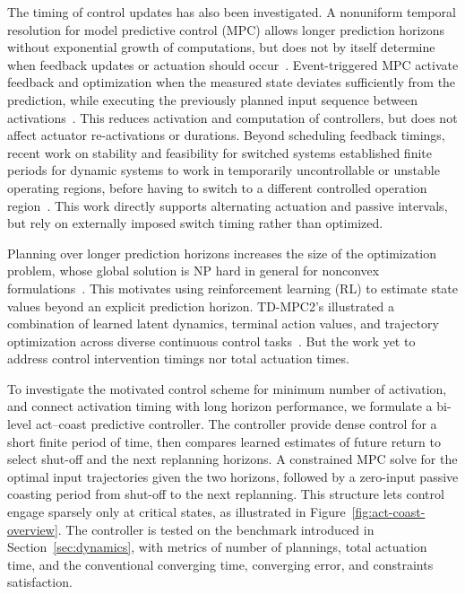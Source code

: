 \documentclass[letterpaper,10pt,conference]{ieeeconf}
\begin{document}
The timing of control updates has also been investigated. A nonuniform temporal resolution for model predictive control (MPC) allows longer prediction horizons without exponential growth of computations, but does not by itself determine when feedback updates or actuation should occur~\cite{ahmed2022}. Event-triggered MPC activate feedback and optimization when the measured state deviates sufficiently from the prediction, while executing the previously planned input sequence between activations~\cite{lehmann2013}. This reduces activation and computation of controllers, but does not affect actuator re-activations or durations. 
Beyond scheduling feedback timings, recent work on stability and feasibility for switched systems established finite periods for dynamic systems to work in temporarily uncontrollable or unstable operating regions, before having to switch to a different controlled operation region~\cite{hall2025}. This work directly supports alternating actuation and passive intervals, but rely on externally imposed switch timing rather than optimized.

Planning over longer prediction horizons increases the size of the optimization problem, whose global solution is NP hard in general for nonconvex formulations~\cite{vavasis1990}. This motivates using reinforcement learning (RL) to estimate state values beyond an explicit prediction horizon. TD-MPC2's illustrated a combination of learned latent dynamics, terminal action values, and trajectory optimization across diverse continuous control tasks~\cite{hansen2024}. But the work yet to address control intervention timings nor total actuation times.

To investigate the motivated control scheme for minimum number of activation, and connect activation timing with long horizon performance, we formulate a bi-level act--coast predictive controller. The controller provide dense control for a short finite period of time, then compares learned estimates of future return to select shut-off and the next replanning horizons. A constrained MPC solve for the optimal input trajectories given the two horizons, followed by a zero-input passive coasting period from shut-off to the next replanning. This structure lets control engage sparsely only at critical states, as illustrated in Figure~\ref{fig:act-coast-overview}. The controller is tested on the benchmark introduced in Section~\ref{sec:dynamics}, with metrics of number of plannings, total actuation time, and the conventional converging time, converging error, and constraints satisfaction.
\end{document}
